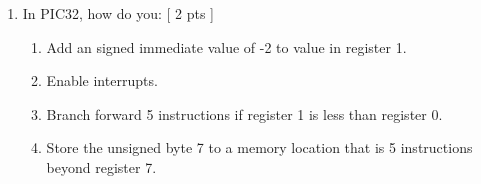 \documentclass[a4paper,11pt]{article}
\begin{document}
\begin{enumerate}
\item In PIC32, how do you: [ 2 pts ]
\begin{enumerate}
\item Add an signed immediate value of -2 to value in register 1.
\item Enable interrupts.
\item Branch forward 5 instructions if register 1 is less than register 0.
\item Store the unsigned byte 7 to a memory location that is 5 instructions beyond register 7.
\end{enumerate}


\end{enumerate}
\end{document}
